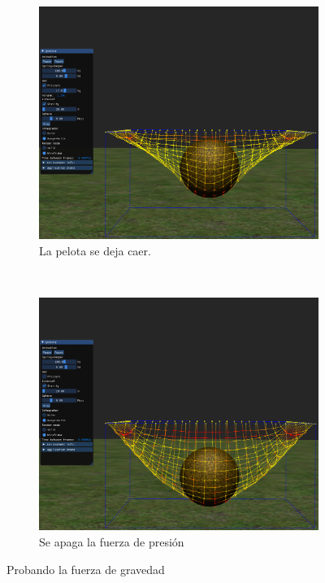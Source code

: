 \begin{figure}
\begin{subfigure}[b]{0.45\textwidth}
  \end{subfigure}
\\
  \begin{subfigure}[b]{0.45\textwidth}
    \includegraphics[width=\textwidth]{img/04/gravity3}
    \caption{La pelota se deja caer.}
    \label{fig:testGCae}
  \end{subfigure}
~
  \begin{subfigure}[b]{0.45\textwidth}
    \includegraphics[width=\textwidth]{img/04/gravity4}
    \caption{Se apaga la fuerza de presión}
    \label{fig:testGNoPres}
  \end{subfigure}
 \caption[Experimento: Fuerza de gravedad]{Probando la fuerza de gravedad} 
 \label{fig:testGravity}
\end{figure}


